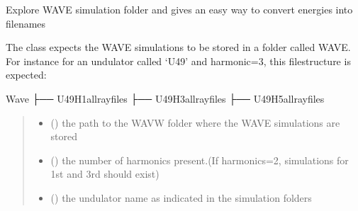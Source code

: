 \documentclass[letterpaper,10pt,english]{sphinxmanual}
\begin{document}
\begin{fulllineitems}
\label{\detokenize{API:raypyng.wave_helper.WaveHelper}}
\pysigstartsignatures
\pysiglinewithargsret
{}
{\sphinxparamcomma {}\sphinxparamcomma {}\sphinxparamcomma {}}
{}
\pysigstopsignatures
\sphinxAtStartPar
Explore WAVE simulation folder and gives an easy way to convert energies into filenames

\sphinxAtStartPar
The class expects the WAVE simulations to be stored in a folder called WAVE.
For instance for an undulator called ‘U49’ and harmonic=3, this filestructure is expected:

\sphinxAtStartPar
Wave
├── U49H1allrayfiles
├── U49H3allrayfiles
├── U49H5allrayfiles
\begin{quote}\begin{description}
\begin{itemize}
\item {} 
\sphinxAtStartPar
{} () \textendash{} the path to the WAVW folder where the WAVE
simulations are stored

\item {} 
\sphinxAtStartPar
{} () \textendash{} the number of harmonics present.(If harmonics=2,
simulations for 1st and 3rd should exist)

\item {} 
\sphinxAtStartPar
{} () \textendash{} the undulator name as indicated in the simulation folders

\end{itemize}

\end{description}\end{quote}


\end{fulllineitems}
\end{document}
